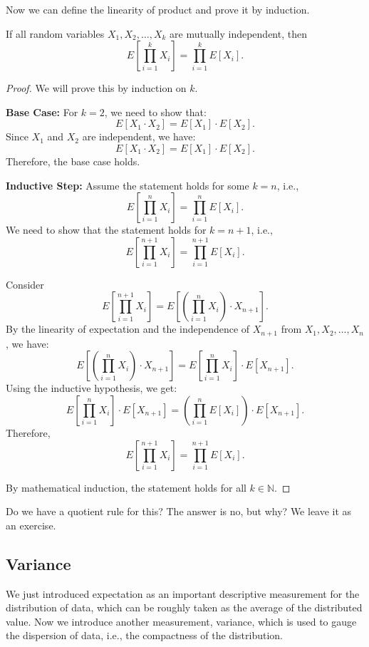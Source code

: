 Now we can define the linearity of product and prove it by induction.
\begin{theorem}
 If all random variables $ X_1, X_2, \ldots, X_k $ are mutually independent, then
    \[
    E\left[ \prod_{i=1}^k X_i \right] = \prod_{i=1}^k E[X_i].
    \]    
\end{theorem}
\begin{proof}
    We will prove this by induction on \( k \).

    \textbf{Base Case:} For \( k = 2 \), we need to show that:
    \[
    E[X_1 \cdot X_2] = E[X_1] \cdot E[X_2].
    \]
    Since \( X_1 \) and \( X_2 \) are independent, we have:
    \[
    E[X_1 \cdot X_2] = E[X_1] \cdot E[X_2].
    \]
    Therefore, the base case holds.

    \textbf{Inductive Step:} Assume the statement holds for some \( k = n \), i.e.,
    \[
    E\left[ \prod_{i=1}^n X_i \right] = \prod_{i=1}^n E[X_i].
    \]
    We need to show that the statement holds for \( k = n+1 \), i.e.,
    \[
    E\left[ \prod_{i=1}^{n+1} X_i \right] = \prod_{i=1}^{n+1} E[X_i].
    \]

    Consider
    \[
    E\left[ \prod_{i=1}^{n+1} X_i \right] = E\left[ \left( \prod_{i=1}^n X_i \right) \cdot X_{n+1} \right].
    \]
    By the linearity of expectation and the independence of \( X_{n+1} \) from \( X_1, X_2, \ldots, X_n \), we have:
    \[
    E\left[ \left( \prod_{i=1}^n X_i \right) \cdot X_{n+1} \right] = E\left[ \prod_{i=1}^n X_i \right] \cdot E[X_{n+1}].
    \]
    Using the inductive hypothesis, we get:
    \[
    E\left[ \prod_{i=1}^n X_i \right] \cdot E[X_{n+1}] = \left( \prod_{i=1}^n E[X_i] \right) \cdot E[X_{n+1}].
    \]
    Therefore,
    \[
    E\left[ \prod_{i=1}^{n+1} X_i \right] = \prod_{i=1}^{n+1} E[X_i].
    \]

    By mathematical induction, the statement holds for all \( k \in \mathbb{N} \).
\end{proof}

Do we have a quotient rule for this? The answer is no, but why? We leave it as an exercise.
\subsection{Variance}
We just introduced expectation as an important descriptive measurement for the distribution of data, which can be roughly taken as the average of the distributed value. Now we introduce another measurement, variance, which is used to gauge the dispersion of data, i.e., the compactness of the distribution. 

